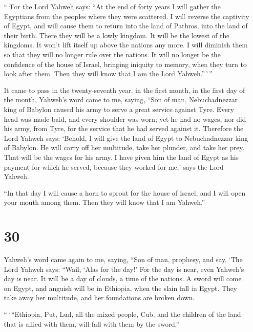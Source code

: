  ``\,`For the Lord Yahweh says: ``At the end of forty
years I will gather the Egyptians from the peoples where they were
scattered.  I will reverse the captivity of Egypt, and
will cause them to return into the land of Pathros, into the land of
their birth. There they will be a lowly kingdom.  It will
be the lowest of the kingdoms. It won't lift itself up above the nations
any more. I will diminish them so that they will no longer rule over the
nations.  It will no longer be the confidence of the
house of Israel, bringing iniquity to memory, when they turn to look
after them. Then they will know that I am the Lord Yahweh.''\,'\,''

 It came to pass in the twenty-seventh year, in the first
month, in the first day of the month, Yahweh's word came to me, saying,
 ``Son of man, Nebuchadnezzar king of Babylon caused his
army to serve a great service against Tyre. Every head was made bald,
and every shoulder was worn; yet he had no wages, nor did his army, from
Tyre, for the service that he had served against it. 
Therefore the Lord Yahweh says: `Behold, I will give the land of Egypt
to Nebuchadnezzar king of Babylon. He will carry off her multitude, take
her plunder, and take her prey. That will be the wages for his army.
 I have given him the land of Egypt as his payment for
which he served, because they worked for me,' says the Lord Yahweh.

 ``In that day I will cause a horn to sprout for the
house of Israel, and I will open your mouth among them. Then they will
know that I am Yahweh.''

\hypertarget{section-29}{%
\section{30}\label{section-29}}

 Yahweh's word came again to me, saying, 
``Son of man, prophesy, and say, `The Lord Yahweh says: ``Wail, `Alas
for the day!'  For the day is near, even Yahweh's day is
near. It will be a day of clouds, a time of the nations. 
A sword will come on Egypt, and anguish will be in Ethiopia, when the
slain fall in Egypt. They take away her multitude, and her foundations
are broken down.

 ``\,`\,``Ethiopia, Put, Lud, all the mixed people, Cub,
and the children of the land that is allied with them, will fall with
them by the sword.''

